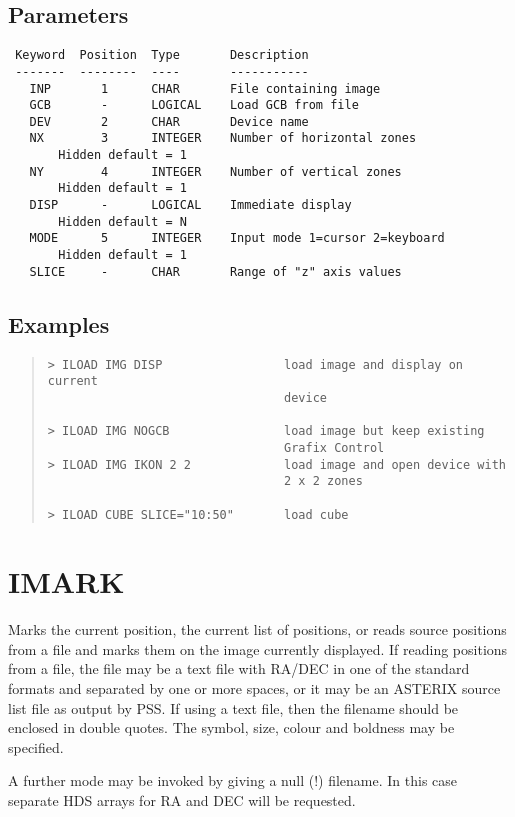 \documentclass{book}
\renewcommand{\_}{{\tt\char'137}}     %
\begin{document}
\subsection{Parameters}
\begin{verbatim}
 Keyword  Position  Type       Description
 -------  --------  ----       -----------
   INP       1      CHAR       File containing image
   GCB       -      LOGICAL    Load GCB from file
   DEV       2      CHAR       Device name
   NX        3      INTEGER    Number of horizontal zones
       Hidden default = 1
   NY        4      INTEGER    Number of vertical zones
       Hidden default = 1
   DISP      -      LOGICAL    Immediate display
       Hidden default = N
   MODE      5      INTEGER    Input mode 1=cursor 2=keyboard
       Hidden default = 1
   SLICE     -      CHAR       Range of "z" axis values
\end{verbatim}\subsection{Examples}
\begin{quote}\begin{verbatim}
> ILOAD IMG DISP                 load image and display on current
                                 device
 
> ILOAD IMG NOGCB                load image but keep existing
                                 Grafix Control
> ILOAD IMG IKON 2 2             load image and open device with
                                 2 x 2 zones
 
> ILOAD CUBE SLICE="10:50"       load cube
 \end{verbatim}\end{quote}
\section{IMARK}
Marks the current position, the current list of positions, or reads
source positions from a file and marks them on the image currently
displayed. If reading positions from a file, the file may be a text
file with RA/DEC in one of the standard formats and separated by one or
more spaces, or it may be an ASTERIX source list file as output by PSS.
If using a text file, then the filename should be enclosed in double
quotes. The symbol, size, colour and boldness may be specified.
 
A further mode may be invoked by giving a null (!) filename.
In this case separate HDS arrays for RA and DEC will be requested.
 
\end{document}

